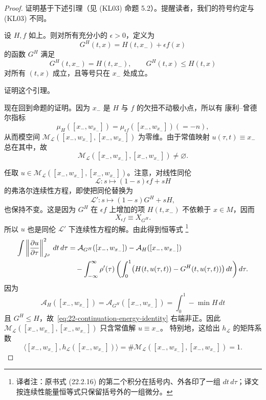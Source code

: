 \begin{proof}
证明基于下述引理（见 (KL03) 命题 5.2）。提醒读者，我们的符号约定与 (KL03) 不同。

\begin{lemma}
\label{lem:22-kerman-lalonde}
设 $H,f$ 如上。则对所有充分小的 $\epsilon>0$，定义为
\[
 G^H(t,x)=H(t,x_-)+\epsilon f(x)
\]
的函数 $G^H$ 满足
\[
 G^H(t,x_-)=H(t,x_-),\qquad G^H(t,x)\leq H(t,x)
\]
对所有 $(t,x)$ 成立，且等号只在 $x_-$ 处成立。
\end{lemma}

\begin{exercise}
\label{ex:22-prove-kerman-lalonde}
证明这个引理。
\end{exercise}

现在回到命题的证明。因为 $x_-$ 是 $H$ 与 $f$ 的欠扭不动极小点，所以有
康利--曾德尔指标
\[
 \mu_H([x_-,w_{x_-}])=\mu_{\epsilon f}([x_-,w_{x_-}])(=-n),
\]
从而模空间
$\mathcal M_{\mathcal L}([x_-,w_{x_-}],[x_-,w_{x_-}])$ 为零维。由于常值映射
$u(\tau,t)\equiv x_-$ 总在其中，故
\[
 \mathcal M_{\mathcal L}([x_-,w_{x_-}],[x_-,w_{x_-}])\neq\varnothing.
\]

任取
$u\in\mathcal M_{\mathcal L}([x_-,w_{x_-}],[x_-,w_{x_-}])$。注意，对线性同伦
\[
 \mathcal L:s\longmapsto(1-s)\epsilon f+sH
\]
的弗洛尔连续性方程，即使把同伦替换为
\[
 \mathcal L':s\longmapsto(1-s)G^H+sH,
\]
也保持不变。这是因为 $G^H$ 在 $\epsilon f$ 上增加的项 $H(t,x_-)$ 不依赖于
$x\in M$，因而
\[
 X_{\epsilon f}\equiv X_{G^H}.
\]
所以 $u$ 也是同伦 $\mathcal L'$ 下连续性方程的解。由此得到恒等式
\footnote{译者注：原书式 (22.2.16) 的第二个积分在括号内、外各印了一组
$dt\,d\tau$；译文按连续性能量恒等式只保留括号外的一组微分。}
\begin{align}
 \int\left\lVert\frac{\partial u}{\partial\tau}\right\rVert_{J^\rho}^2
 \,dt\,d\tau
 &=\mathcal A_{G^H}([x_-,w_{x_-}])
 -\mathcal A_H([x_-,w_{x_-}])\notag\\
 &\quad-\int_{-\infty}^{\infty}\rho'(\tau)
 \left(\int_0^1\bigl(H(t,u(\tau,t))-G^H(t,u(\tau,t))\bigr)\,dt\right)d\tau.
 \label{eq:22-continuation-energy-identity}
\end{align}
因为
\[
 \mathcal A_H([x_-,w_{x_-}])
 =\mathcal A_{G^H}([x_-,w_{x_-}])
 =\int_0^1-\min H\,dt
\]
且 $G^H\leq H$，故~\eqref{eq:22-continuation-energy-identity} 右端非正。因此
$\mathcal M_{\mathcal L}([x_-,w_{x_-}],[x_-,w_{x_-}])$ 只含常值解 $u\equiv x_-$。
特别地，这给出 $h_{\mathcal L}$ 的矩阵系数
\[
 \langle[x_-,w_{x_-}],h_{\mathcal L}([x_-,w_{x_-}])\rangle
 =\#\mathcal M_{\mathcal L}([x_-,w_{x_-}],[x_-,w_{x_-}])=1.
\]


\end{proof}
